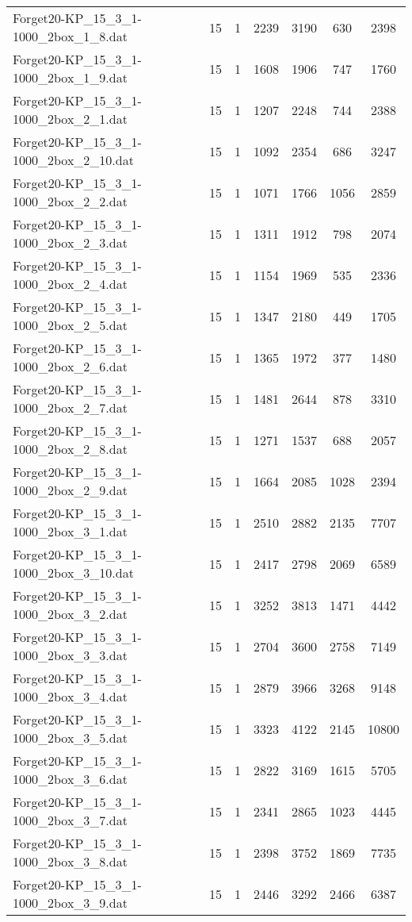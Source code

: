 \begin{table}[!ht]
\begin{tabular}{lcccccc}
Forget20-KP\_15\_3\_1-1000\_2box\_1\_8.dat & 15 & 1 & 2239 & 3190 & 630 & 2398 \\
Forget20-KP\_15\_3\_1-1000\_2box\_1\_9.dat & 15 & 1 & 1608 & 1906 & 747 & 1760 \\
Forget20-KP\_15\_3\_1-1000\_2box\_2\_1.dat & 15 & 1 & 1207 & 2248 & 744 & 2388 \\
Forget20-KP\_15\_3\_1-1000\_2box\_2\_10.dat & 15 & 1 & 1092 & 2354 & 686 & 3247 \\
Forget20-KP\_15\_3\_1-1000\_2box\_2\_2.dat & 15 & 1 & 1071 & 1766 & 1056 & 2859 \\
Forget20-KP\_15\_3\_1-1000\_2box\_2\_3.dat & 15 & 1 & 1311 & 1912 & 798 & 2074 \\
Forget20-KP\_15\_3\_1-1000\_2box\_2\_4.dat & 15 & 1 & 1154 & 1969 & 535 & 2336 \\
Forget20-KP\_15\_3\_1-1000\_2box\_2\_5.dat & 15 & 1 & 1347 & 2180 & 449 & 1705 \\
Forget20-KP\_15\_3\_1-1000\_2box\_2\_6.dat & 15 & 1 & 1365 & 1972 & 377 & 1480 \\
Forget20-KP\_15\_3\_1-1000\_2box\_2\_7.dat & 15 & 1 & 1481 & 2644 & 878 & 3310 \\
Forget20-KP\_15\_3\_1-1000\_2box\_2\_8.dat & 15 & 1 & 1271 & 1537 & 688 & 2057 \\
Forget20-KP\_15\_3\_1-1000\_2box\_2\_9.dat & 15 & 1 & 1664 & 2085 & 1028 & 2394 \\
Forget20-KP\_15\_3\_1-1000\_2box\_3\_1.dat & 15 & 1 & 2510 & 2882 & 2135 & 7707 \\
Forget20-KP\_15\_3\_1-1000\_2box\_3\_10.dat & 15 & 1 & 2417 & 2798 & 2069 & 6589 \\
Forget20-KP\_15\_3\_1-1000\_2box\_3\_2.dat & 15 & 1 & 3252 & 3813 & 1471 & 4442 \\
Forget20-KP\_15\_3\_1-1000\_2box\_3\_3.dat & 15 & 1 & 2704 & 3600 & 2758 & 7149 \\
Forget20-KP\_15\_3\_1-1000\_2box\_3\_4.dat & 15 & 1 & 2879 & 3966 & 3268 & 9148 \\
Forget20-KP\_15\_3\_1-1000\_2box\_3\_5.dat & 15 & 1 & 3323 & 4122 & 2145 & 10800 \\
Forget20-KP\_15\_3\_1-1000\_2box\_3\_6.dat & 15 & 1 & 2822 & 3169 & 1615 & 5705 \\
Forget20-KP\_15\_3\_1-1000\_2box\_3\_7.dat & 15 & 1 & 2341 & 2865 & 1023 & 4445 \\
Forget20-KP\_15\_3\_1-1000\_2box\_3\_8.dat & 15 & 1 & 2398 & 3752 & 1869 & 7735 \\
Forget20-KP\_15\_3\_1-1000\_2box\_3\_9.dat & 15 & 1 & 2446 & 3292 & 2466 & 6387 \\

\end{tabular}
\end{table}
